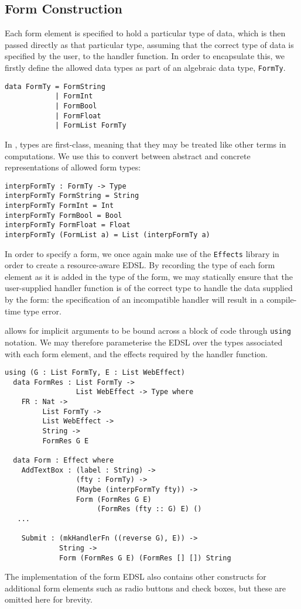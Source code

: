 \documentclass[preprint]{sigplanconf}
\begin{document}
\subsection{Form Construction}
Each form element is specified to hold a particular type of data, which is then passed directly as that particular type, assuming that the correct type of data is specified by the user, to the handler function. In order to encapsulate this, we firstly define the allowed data types as part of an algebraic data type, \texttt{FormTy}.
{\small
\begin{verbatim}
data FormTy = FormString
            | FormInt
            | FormBool
            | FormFloat
            | FormList FormTy 
\end{verbatim}
}
In \idris{}, types are first-class, meaning that they may be treated like other terms in computations. We use this to convert between abstract and concrete representations of allowed form types:
{\small
\begin{verbatim}
interpFormTy : FormTy -> Type
interpFormTy FormString = String
interpFormTy FormInt = Int
interpFormTy FormBool = Bool
interpFormTy FormFloat = Float
interpFormTy (FormList a) = List (interpFormTy a)
\end{verbatim}
}
%
In order to specify a form, we once again make use of the \texttt{Effects} library in order to create a resource-aware EDSL. By recording the type of each form element as it is added in the type of the form, we may statically ensure that the user-supplied handler function is of the correct type to handle the data supplied by the form: the specification of an incompatible handler will result in a compile-time type error.

\idris{} allows for implicit arguments to be bound across a block of code through \texttt{using} notation. We may therefore parameterise the EDSL over the types associated with each form element, and the effects required by the handler function.

{\small
\begin{verbatim}
using (G : List FormTy, E : List WebEffect)
  data FormRes : List FormTy -> 
                 List WebEffect -> Type where
    FR : Nat -> 
         List FormTy -> 
         List WebEffect -> 
         String -> 
         FormRes G E
  
  data Form : Effect where
    AddTextBox : (label : String) -> 
                 (fty : FormTy) -> 
                 (Maybe (interpFormTy fty)) -> 
                 Form (FormRes G E) 
                      (FormRes (fty :: G) E) () 
   ...
   
    Submit : (mkHandlerFn ((reverse G), E)) ->
             String -> 
             Form (FormRes G E) (FormRes [] []) String
\end{verbatim}
}
The implementation of the form EDSL also contains other constructs for additional form elements such as radio buttons and check boxes, but these are omitted here for brevity.
\end{document}
